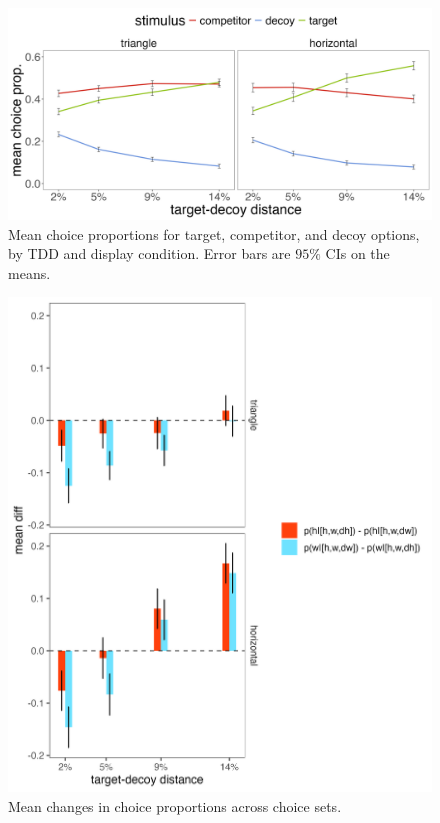 \begin{figure}
   \includegraphics[width=\textwidth]{figures/choicePhase_att_trials_mean_choice_props_collapsed.jpg}
   \caption{Mean choice proportions for target, competitor, and decoy options, by TDD and display condition. Error bars are $95\%$ CIs on the means.}
   \label{fig:e2_choiceprops}
\end{figure}

\begin{figure}
   \includegraphics[width=\textwidth]{figures/choicePhase_delta_means.jpeg}
   \caption{Mean changes in choice proportions across choice sets.}
   \label{fig:e2_choicedeltas}
\end{figure}

